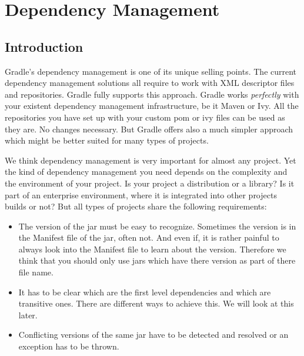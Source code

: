 \chapter{Dependency Management}

\section{Introduction} %
\label{sec:Introduction}
Gradle's dependency management is one of its unique selling points. The current dependency management solutions all require to work with XML descriptor files and repositories. Gradle fully supports this approach. Gradle works \emph{perfectly} with your existent dependency management infrastructure, be it Maven or Ivy. All the repositories you have set up with your custom pom or ivy files can be used as they are. No changes necessary. But Gradle offers also a much simpler approach which might be better suited for many types of projects. 

We think dependency management is very important for almost any project. Yet the kind of dependency management you need depends on the complexity and the environment of your project. Is your project a distribution or a library? Is it part of an enterprise environment, where it is integrated into other projects builds or not? But all types of projects share the following requirements:
\begin{itemize}
\item The version of the jar must be easy to recognize. Sometimes the version is in the Manifest file of the jar, often not. And even if, it is rather painful to always look into the Manifest file to learn about the version. Therefore we think that you should only use jars which have there version as part of there file name.
\item It has to be clear which are the first level dependencies and which are transitive ones. There are different ways to achieve this. We will look at this later.
\item Conflicting versions of the same jar have to be detected and resolved or an exception has to be thrown.
\end{itemize}

